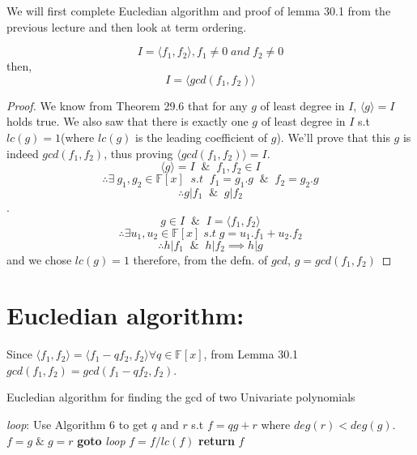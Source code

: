 We will first complete Eucledian algorithm and proof of lemma 30.1 from the previous lecture and then look at term ordering.
\begin{lemma}
$$I = \langle f_1, f_2\rangle , f_1 \neq 0\;and\;f_2\neq 0$$
then,$$I=\langle gcd(f_1,f_2)\rangle $$
\end{lemma}
\begin{proof}
We know from Theorem 29.6 that for any $g$ of least degree in $I$, $\langle g\rangle =I$ holds true. We also saw that there is exactly one $g$ of least degree in $I$ s.t $lc(g)=1$(where $lc(g)$ is the leading coefficient of $g$). We'll prove that this $g$ is indeed $gcd(f_{1},f_{2})$, thus proving $\langle gcd(f_{1},f_{2})\rangle =I$.
$$\langle g\rangle =I\;\;\&\;\;f_{1},f_{2}\in I$$ 
$$\therefore \exists\ g_{1},g_{2}\in \mathbb{F}[x]\;\;s.t\;\;f_{1}=g_{1}.g\;\;\&\;\;f_{2}=g_{2}.g$$ 
$$\therefore g|f_{1}\;\;\&\;\;g|f_{2}$$.
$$g\in I\;\;\&\;\;I=\langle f_{1},f_{2}\rangle $$
$$\therefore\exists u_{1},u_{2}\in \mathbb{F}[x]\;s.t\;g=u_{1}.f_{1}+u_{2}.f_{2}$$
$$\therefore h|f_{1}\;\;\&\;\;h|f_{2} \implies h|g$$
and we chose $lc(g)=1$
therefore, from the defn. of $gcd$, $g=gcd(f_{1},f_{2})$
\end{proof}
\section*{Eucledian algorithm:}
Since $\langle f_{1},f_{2}\rangle =\langle f_{1}-qf_{2},f_{2}\rangle \forall q\in \mathbb{F}[x]$, from Lemma 30.1  $gcd(f_{1},f_{2})=gcd(f_{1}-qf_{2},f_{2})$.
\begin{algorithm}
\caption{Eucledian algorithm for finding the gcd of two Univariate polynomials}\label{euclid}
\begin{algorithmic}[1]
\State \emph{loop}:
\State Use Algorithm 6 to get $q$ and $r$ s.t $f=qg+r$ where $deg(r)< deg(g)$.
\State $f=g\;\&\;g=r$
\State \textbf{goto} \emph{loop}
\EndIf
\State $f=f/lc(f)$
\State \textbf{return} $f$
\EndProcedure
\end{algorithmic}
\end{algorithm}
